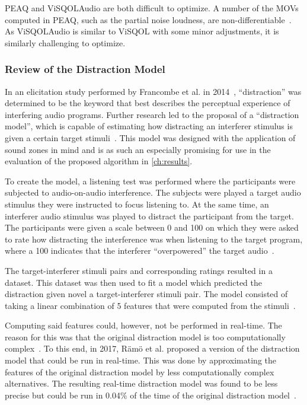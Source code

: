 PEAQ and ViSQOLAudio are both difficult to optimize.
A number of the MOVs computed in PEAQ, such as the partial noise loudness, are non-differentiable~\cite{thiede2000peaq}.
As ViSQOLAudio is similar to ViSQOL with some minor adjustments, it is similarly challenging to optimize.

\subsubsection{Review of the Distraction Model}
In an elicitation study performed by Francombe et al. 
in 2014~\cite{francombe2014elicitation}, ``distraction'' was determined to be the keyword that best describes the perceptual experience of interfering audio programs.
Further research led to the proposal of a ``distraction model'', which is capable of estimating how distracting an interferer stimulus is given a certain target stimuli~\cite{francombe2015model}.
This model was designed with the application of sound zones in mind and is as such an especially promising
for use in the evaluation of the proposed algorithm in \autoref{ch:results}.

To create the model, a listening test was performed where the participants were subjected to audio-on-audio interference.
The subjects were played a target audio stimulus they were instructed to focus listening to.
At the same time, an interferer audio stimulus was played to distract the participant from the target.
The participants were given a scale between 0 and 100 on which they were asked to rate how distracting the interference
was when listening to the target program, where a 100 indicates that the interferer ``overpowered'' the target audio~\cite{francombe2015model}.

The target-interferer stimuli pairs and corresponding ratings resulted in a dataset.
This dataset was then used to fit a model which predicted the distraction given novel a target-interferer stimuli pair.
The model consisted of taking a linear combination of 5 features that were computed from the stimuli~\cite{francombe2015model}.

Computing said features could, however, not be performed in real-time.
The reason for this was that the original distraction model is too computationally complex~\cite{ramo2017real}.
To this end, in 2017, R\"am\"o et al. proposed a version of the distraction model that could be run in real-time.
This was done by approximating the features of the original distraction model by less computationally complex alternatives.
The resulting real-time distraction model was found to be less precise but could be run in 0.04\% of the time of the 
original distraction model~\cite{ramo2017real}.

